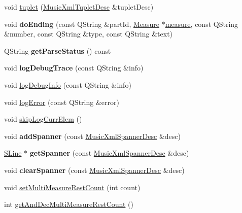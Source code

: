 \begin{DoxyCompactItemize}
\item 
void \hyperlink{class_ms_1_1_music_x_m_l_parser_pass2_a1b43f9277d17fe4dfa909d711c4df21a}{tuplet} (\hyperlink{struct_ms_1_1_music_xml_tuplet_desc}{Music\+Xml\+Tuplet\+Desc} \&tuplet\+Desc)
\item 
\mbox{\label{class_ms_1_1_music_x_m_l_parser_pass2_ab35c8808afa7ad2c74c59e93af716b06}} 
void {\bfseries do\+Ending} (const Q\+String \&part\+Id, \hyperlink{class_ms_1_1_measure}{Measure} $\ast$\hyperlink{class_ms_1_1_music_x_m_l_parser_pass2_a0a37fd1f0a5c962fed1c843c00de07aa}{measure}, const Q\+String \&number, const Q\+String \&type, const Q\+String \&text)
\item 
\mbox{\label{class_ms_1_1_music_x_m_l_parser_pass2_a57e983b37a5a06f337254e95f88c6be2}} 
Q\+String {\bfseries get\+Parse\+Status} () const
\item 
\mbox{\label{class_ms_1_1_music_x_m_l_parser_pass2_a796d6fcbc39dab93597b786c004b8345}} 
void {\bfseries log\+Debug\+Trace} (const Q\+String \&info)
\item 
void \hyperlink{class_ms_1_1_music_x_m_l_parser_pass2_a6292f48423d6ed5e2dbcae2b43cf906f}{log\+Debug\+Info} (const Q\+String \&info)
\item 
void \hyperlink{class_ms_1_1_music_x_m_l_parser_pass2_af55888c2ddfc198a3b1b7eec352873ca}{log\+Error} (const Q\+String \&error)
\item 
void \hyperlink{class_ms_1_1_music_x_m_l_parser_pass2_a3faf1fc79c6220380fb79e9cf6723863}{skip\+Log\+Curr\+Elem} ()
\item 
\mbox{\label{class_ms_1_1_music_x_m_l_parser_pass2_a43212c21e5c998004246c90586394b6a}} 
void {\bfseries add\+Spanner} (const \hyperlink{struct_ms_1_1_music_xml_spanner_desc}{Music\+Xml\+Spanner\+Desc} \&desc)
\item 
\mbox{\label{class_ms_1_1_music_x_m_l_parser_pass2_a37424dae9aca3cc319ba8be99d841892}} 
\hyperlink{class_ms_1_1_s_line}{S\+Line} $\ast$ {\bfseries get\+Spanner} (const \hyperlink{struct_ms_1_1_music_xml_spanner_desc}{Music\+Xml\+Spanner\+Desc} \&desc)
\item 
\mbox{\label{class_ms_1_1_music_x_m_l_parser_pass2_ac396f512b2bfe7fc6025e7bfaee3ab38}} 
void {\bfseries clear\+Spanner} (const \hyperlink{struct_ms_1_1_music_xml_spanner_desc}{Music\+Xml\+Spanner\+Desc} \&desc)
\item 
void \hyperlink{class_ms_1_1_music_x_m_l_parser_pass2_aad5e88f33bef3012d988e10141c2b3a4}{set\+Multi\+Measure\+Rest\+Count} (int count)
\item 
int \hyperlink{class_ms_1_1_music_x_m_l_parser_pass2_a6dfc2c4814c754167689df84b9202689}{get\+And\+Dec\+Multi\+Measure\+Rest\+Count} ()
\end{DoxyCompactItemize}


